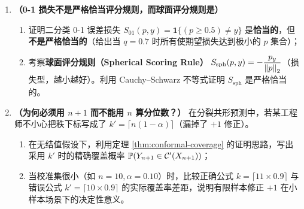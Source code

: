 \begin{enumerate}[label=\textbf{7.2.\arabic*}, start=3]
  \item \textbf{（0-1 损失不是严格恰当评分规则，而球面评分规则是）}
  \begin{enumerate}
    \item 证明二分类 0-1 误差损失 $S_{01}(p, y) = \mathbf{1}\{(p \ge 0.5) \neq y\}$ 是\textbf{恰当的}，但\textbf{不是严格恰当的}（给出当 $q=0.7$ 时所有使期望损失达到极小的 $p$ 集合）；
    \item 考察\textbf{球面评分规则（Spherical Scoring Rule）} $S_{\mathrm{sph}}(p, y) = -\dfrac{p_y}{\left\|p\right\|_2}$（损失型，越小越好）。利用 Cauchy--Schwarz 不等式证明 $S_{\mathrm{sph}}$ 是严格恰当的。
  \end{enumerate}

  \item \textbf{（为何必须用 $n+1$ 而不能用 $n$ 算分位数？）} 在分裂共形预测中，若某工程师不小心把秩下标写成了 $k' = \lceil n(1-\alpha) \rceil$（漏掉了 $+1$ 修正）。
  \begin{enumerate}
    \item 在无结值假设下，利用定理 \ref{thm:conformal-coverage} 的证明思路，写出采用 $k'$ 时的精确覆盖概率 $\mathbb{P}(Y_{n+1} \in \mathcal{C}'(X_{n+1}))$；
    \item 当校准集很小（如 $n=10, \alpha=0.10$）时，比较正确公式 $k = \lceil 11 \times 0.9 \rceil$ 与错误公式 $k' = \lceil 10 \times 0.9 \rceil$ 的实际覆盖率差距，说明有限样本修正 $+1$ 在小样本场景下的决定性意义。
  \end{enumerate}
\end{enumerate}


